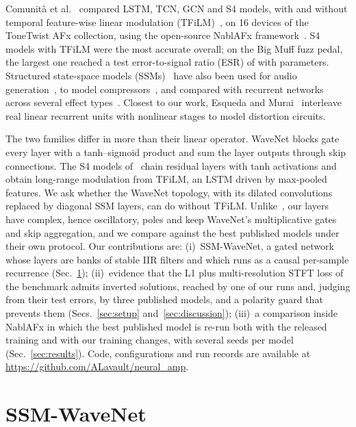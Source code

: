 \documentclass{article}
\begin{document}
Comunit\`a et al.~\cite{comunita2025frontiers} compared LSTM, TCN, GCN and S4
models, with and without temporal feature-wise linear modulation
(TFiLM)~\cite{birnbaum2019tfilm, comunita2023icassp}, on 16 devices of the
ToneTwist AFx collection, using the open-source NablAFx
framework~\cite{comunita2025nablafx}. S4 models with TFiLM were the most
accurate overall; on the Big Muff fuzz pedal, the largest one reached a test
error-to-signal ratio (ESR) of \PubSFourTFLesr{} with \PubSFourTFLparams{}
parameters. Structured state-space models (SSMs)~\cite{gu2022s4, gupta2022dss,
gu2022s4d} have also been used for audio generation~\cite{goel2022sashimi}, to
model compressors~\cite{yin2024drc, simionato2025jaes}, and compared with
recurrent networks across several effect types~\cite{simionato2025ssm}. Closest
to our work, Esqueda and Murai~\cite{esqueda2025lru} interleave real linear
recurrent units with nonlinear stages to model distortion circuits.

The two families differ in more than their linear operator. WaveNet blocks gate
every layer with a tanh--sigmoid product and sum the layer outputs through skip
connections. The S4 models of~\cite{comunita2025frontiers} chain residual layers
with tanh activations and obtain long-range modulation from TFiLM, an LSTM
driven by max-pooled features. We ask whether the WaveNet topology, with its
dilated convolutions replaced by diagonal SSM layers, can do without TFiLM.
Unlike~\cite{esqueda2025lru}, our layers have complex, hence oscillatory, poles
and keep WaveNet's multiplicative gates and skip aggregation, and we compare
against the best published models under their own protocol. Our
contributions are:
(i)~SSM-WaveNet, a gated network whose layers are banks of stable IIR filters
and which runs as a causal per-sample recurrence (Sec.~\ref{sec:model});
(ii)~evidence that the L1 plus multi-resolution STFT loss of the benchmark
admits inverted solutions, reached by one of our runs and, judging from their
test errors, by three published models, and a polarity guard that prevents them
(Secs.~\ref{sec:setup} and~\ref{sec:discussion});
(iii)~a comparison inside NablAFx in which the best published model is re-run
both with the released training and with our training changes, with several
seeds per model (Sec.~\ref{sec:results}). Code, configurations and run records
are available at \url{https://github.com/ALavault/neural_amp}.

\section{SSM-WaveNet}
\label{sec:model}
\end{document}
